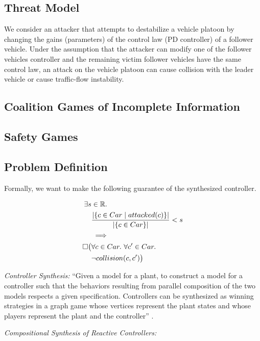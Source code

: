 
\subsection{Threat Model}

We consider an attacker that attempts to destabilize a vehicle platoon by changing the gains (parameters) of the control law (PD controller) of a follower vehicle. Under the assumption that the attacker can modify one of the follower vehicles controller and the remaining victim follower vehicles have the same control law, an attack on the vehicle platoon can cause collision with the leader vehicle or cause traffic-flow instability.   




\subsection{Coalition Games of Incomplete Information}

\subsection{Safety Games}


\subsection{Problem Definition}

Formally, we want to make the following guarantee of the synthesized controller.

\begin{align*}
    \exists s &\in \mathbb{R}.\\
    &\frac{\left\vert\{ c \in Car \mid attacked(c) \}\right\vert} {\left\vert\{ c \in Car \}\right\vert} < s\\
    &\implies\\
    \square\big( & \forall c \in Car.\ \forall c' \in Car.\\
    &\neg collision(c,c')\big)
\end{align*}

\textit{Controller Synthesis:} ``Given a model for a plant, to construct a model for a controller such that the behaviors resulting from parallel composition of the two models respects a given specification. Controllers can be synthesized as winning strategies in a graph game whose vertices represent the plant states and whose players represent the plant and the controller'' \cite{kchatterjee}.  

\medskip

\noindent \textit{Compositional Synthesis of Reactive Controllers:}